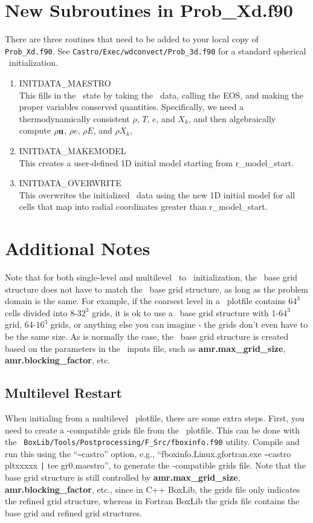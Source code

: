 \section{New Subroutines in Prob\_Xd.f90}
There are three routines that need to be added to your local copy of
{\tt Prob\_Xd.f90}.  See {\tt Castro/Exec/wdconvect/Prob\_3d.f90} for
a standard spherical \maestro\ initialization.
\begin{enumerate}
\item INITDATA\_MAESTRO\\ This fills in the \castro\ state by taking
  the \maestro\ data, calling the EOS, and making the proper variables
  conserved quantities.  Specifically, we need a thermodynamically
  consistent $\rho$, $T$, $e$, and $X_k$, and then algebraically
  compute $\rho{\bf u}$, $\rho e$, $\rho E$, and $\rho X_k$,
\item INITDATA\_MAKEMODEL\\
This creates a user-defined 1D initial model starting from r\_model\_start.
\item INITDATA\_OVERWRITE\\ This overwrites the initialized \castro\
  data using the new 1D initial model for all cells that map into
  radial coordinates greater than r\_model\_start.
\end{enumerate}

\section{Additional Notes}
Note that for both single-level and multilevel \maestro\ to \castro\
initialization, the \castro\ base grid structure does not have to match
the \maestro\ base grid structure, as long as the problem domain is the
same.  For example, if the coarsest level in a \maestro\ plotfile
contains $64^3$ cells divided into 8-$32^3$ grids, it is ok to use a
\castro\ base grid structure with 1-$64^3$ grid, 64-$16^3$ grids, or
anything else you can imagine - the grids don't even have to be the
same size.  As is normally the case, the \castro\ base grid structure is
created based on the parameters in the \castro\ inputs file, such as
{\bf amr.max\_grid\_size}, {\bf amr.blocking\_factor}, etc.

\subsection{Multilevel Restart}
When initialing from a multilevel \maestro\ plotfile, there are some
extra steps.  First, you need to create a \castro-compatible grids file
from the \maestro\ plotfile.  This can be done with the {\tt
  BoxLib/Tools/Postprocessing/F\_Src/fboxinfo.f90} utility.  Compile
and run this using the ``\texttt{--}castro'' option, e.g.,
``fboxinfo.Linux.gfortran.exe \texttt{--}castro pltxxxxx \texttt{|}
tee gr0.maestro'', to generate the \castro-compatible grids file.  Note
that the base grid structure is still controlled by {\bf
  amr.max\_grid\_size}, {\bf amr.blocking\_factor}, etc., since in C++
BoxLib, the grids file only indicates the refined grid structure,
whereas in Fortran BoxLib the grids file contains the base grid and
refined grid structures.

